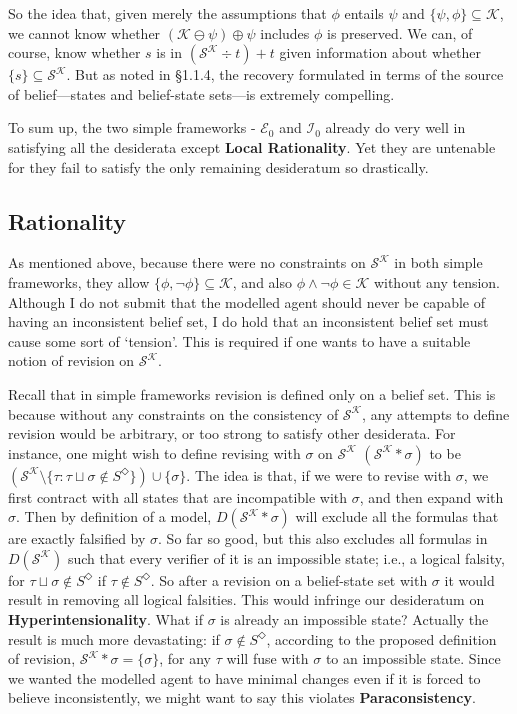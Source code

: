 \documentclass[12pt]{article}
\newcommand{\K}{\mathcal{K}}
\newcommand{\SK}{\mathcal{S}^\mathcal{K}}
\begin{document}
\par
So the idea that, given merely the assumptions that $\phi$ entails $\psi$ and $\{\psi, \phi\} \subseteq \K$, we cannot know whether $(\K \ominus \psi) \oplus \psi$ includes $\phi$ is preserved. We can, of course, know whether $s$ is in $(\SK \div t) + t$ given information about whether $\{s\} \subseteq \SK$. But as noted in \S 1.1.4, the recovery formulated in terms of the source of belief---states and belief-state sets---is extremely compelling. 
\par
To sum up, the two simple frameworks - $\mathcal{E}_0$ and $\mathcal{I}_0$ already do very well in satisfying all the desiderata except \textbf{Local Rationality}. Yet they are untenable for they fail to satisfy the only remaining desideratum so drastically. 
\subsection{Rationality} 
As mentioned above, because there were no constraints on $\SK$ in both simple frameworks, they allow $\{\phi, \lnot \phi\} \subseteq \K$, and also $\phi \land \lnot \phi \in \K$ without any tension. Although I do not submit that the modelled agent should never be capable of having an inconsistent belief set, I do hold that an inconsistent belief set must cause some sort of `tension'. This is required if one wants to have a suitable notion of revision on $\SK$. 
\par
Recall that in simple frameworks revision is defined only on a belief set. This is because without any constraints on the consistency of $\SK$, any attempts to define revision would be arbitrary, or too strong to satisfy other desiderata. For instance, one might wish to define revising with $\sigma$ on $\SK$ $(\SK * \sigma)$ to be $(\SK \setminus \{\tau: \tau \sqcup \sigma \notin S^\Diamond\}) \cup \{\sigma\}$. The idea is that, if we were to revise with $\sigma$, we first contract with all states that are incompatible with $\sigma$, and then expand with $\sigma$. Then by definition of a model, $D(\SK * \sigma)$ will exclude all the formulas that are exactly falsified by $\sigma$. So far so good, but this also excludes all formulas in $D(\SK)$ such that every verifier of it is an impossible state; i.e., a logical falsity, for $\tau \sqcup \sigma \notin S^\Diamond$ if $\tau \notin S^\Diamond$. So after a revision on a belief-state set with $\sigma$ it would result in removing all logical falsities. This would infringe our desideratum on \textbf{Hyperintensionality}. What if $\sigma$ is already an impossible state? Actually the result is much more devastating: if $\sigma \notin S^\Diamond$, according to the proposed definition of revision, $\SK * \sigma = \{\sigma\}$, for any $\tau$ will fuse with $\sigma$ to an impossible state. Since we wanted the modelled agent to have minimal changes even if it is forced to believe inconsistently, we might want to say this violates \textbf{Paraconsistency}. 
\end{document}
